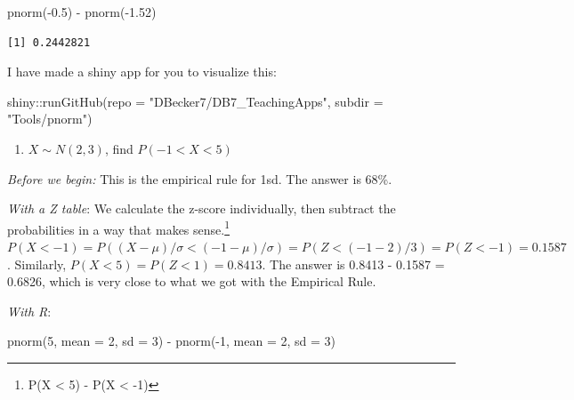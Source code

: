 \documentclass[
  letterpaper,
  DIV=11,
  numbers=noendperiod]{scrreprt}
\newenvironment{Shaded}{\begin{snugshade}}{\end{snugshade}}
\newcommand{\AttributeTok}[1]{\textcolor[rgb]{0.40,0.45,0.13}{#1}}
\newcommand{\DecValTok}[1]{\textcolor[rgb]{0.68,0.00,0.00}{#1}}
\newcommand{\FloatTok}[1]{\textcolor[rgb]{0.68,0.00,0.00}{#1}}
\newcommand{\FunctionTok}[1]{\textcolor[rgb]{0.28,0.35,0.67}{#1}}
\newcommand{\NormalTok}[1]{\textcolor[rgb]{0.00,0.23,0.31}{#1}}
\newcommand{\SpecialCharTok}[1]{\textcolor[rgb]{0.37,0.37,0.37}{#1}}
\newcommand{\StringTok}[1]{\textcolor[rgb]{0.13,0.47,0.30}{#1}}
\providecommand{\tightlist}{%
  \setlength{\itemsep}{0pt}\setlength{\parskip}{0pt}}\usepackage{longtable,booktabs,array}
\begin{document}
\begin{Shaded}
\begin{Highlighting}[]
\FunctionTok{pnorm}\NormalTok{(}\SpecialCharTok{{-}}\FloatTok{0.5}\NormalTok{) }\SpecialCharTok{{-}} \FunctionTok{pnorm}\NormalTok{(}\SpecialCharTok{{-}}\FloatTok{1.52}\NormalTok{)}
\end{Highlighting}
\end{Shaded}

\begin{verbatim}
[1] 0.2442821
\end{verbatim}

I have made a shiny app for you to visualize this:

\begin{Shaded}
\begin{Highlighting}[]
\NormalTok{shiny}\SpecialCharTok{::}\FunctionTok{runGitHub}\NormalTok{(}\AttributeTok{repo =} \StringTok{"DBecker7/DB7\_TeachingApps"}\NormalTok{, }
    \AttributeTok{subdir =} \StringTok{"Tools/pnorm"}\NormalTok{)}
\end{Highlighting}
\end{Shaded}

\begin{enumerate}
\def\labelenumi{\arabic{enumi}.}
\setcounter{enumi}{5}
\tightlist
\item
  \(X \sim N(2,3)\), find \(P(-1 < X < 5)\)
\end{enumerate}

\emph{Before we begin:} This is the empirical rule for 1sd. The answer
is 68\%.

\emph{With a Z table}: We calculate the z-score individually, then
subtract the probabilities in a way that makes sense.\footnote{P(X
  \textless{} 5) - P(X \textless{} -1)}
\(P(X < -1) = P((X-\mu)/\sigma < (-1 - \mu)/\sigma) = P(Z < (-1 - 2)/3) = P(Z < -1) = 0.1587\).
Similarly, \(P(X < 5) = P(Z < 1) = 0.8413\). The answer is 0.8413 -
0.1587 = 0.6826, which is very close to what we got with the Empirical
Rule.

\emph{With R}:

\begin{Shaded}
\begin{Highlighting}[]
\FunctionTok{pnorm}\NormalTok{(}\DecValTok{5}\NormalTok{, }\AttributeTok{mean =} \DecValTok{2}\NormalTok{, }\AttributeTok{sd =} \DecValTok{3}\NormalTok{) }\SpecialCharTok{{-}} \FunctionTok{pnorm}\NormalTok{(}\SpecialCharTok{{-}}\DecValTok{1}\NormalTok{, }\AttributeTok{mean =} \DecValTok{2}\NormalTok{, }\AttributeTok{sd =} \DecValTok{3}\NormalTok{)}
\end{Highlighting}
\end{Shaded}
\end{document}
